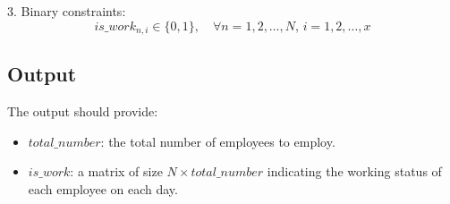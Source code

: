 \documentclass{article}
\begin{document}
3. Binary constraints:
\[
is\_work_{n,i} \in \{0, 1\}, \quad \forall n = 1, 2, \ldots, N, \, i = 1, 2, \ldots, x
\]

\subsection*{Output}
The output should provide:
\begin{itemize}
    \item \( total\_number \): the total number of employees to employ.
    \item \( is\_work \): a matrix of size \( N \times total\_number \) indicating the working status of each employee on each day.
\end{itemize}
\end{document}
